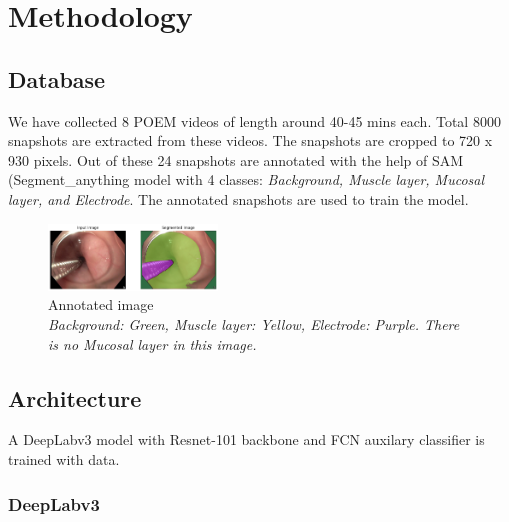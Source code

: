 \section{Methodology}
\label{sec:Methodology}

\subsection{Database}
We have collected 8 POEM videos of length around 40-45 mins each. Total 8000 snapshots are extracted from these videos. The snapshots are cropped to 720 x 930 pixels. Out of these 24 snapshots are annotated with the help of SAM (Segment\_anything  model with 4 classes: \textit{Background, Muscle layer, Mucosal layer, and Electrode}. The annotated snapshots are used to train the model.

\begin{figure}[ht]
    \centering
    \includegraphics[width=0.4\textwidth]{Images/annoted.png}
    \caption{Annotated image \\ \textit{Background: Green, Muscle layer: Yellow, Electrode: Purple. There is no Mucosal layer in this image.}}
    \label{fig:annotated}
\end{figure}

\subsection{Architecture}

A DeepLabv3 model with Resnet-101 backbone and FCN auxilary classifier is trained with data. 

\subsubsection{DeepLabv3}

